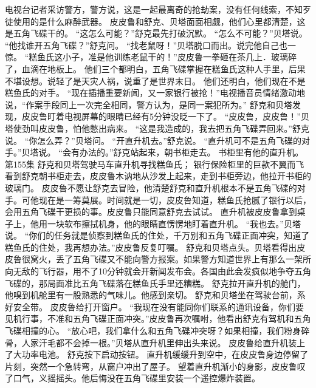 \documentclass[a4paper,12pt,UTF8,twoside]{ctexbook}
\begin{document}
        电视台记者采访警方，警方说，这是一起最离奇的抢劫案，没有任何线索，不知歹徒使用的是什么麻醉武器。 
        皮皮鲁和舒克、贝塔面面相觑，他们心里都清楚，这是五角飞碟干的。 
        “这怎么可能？”舒克最先打破沉默。 
        “怎么不可能？”贝塔说。 
        “他找谁开五角飞碟？”舒克问。 
        “找老鼠呀！”贝塔脱口而出。说完他自己也一惊。 
        “糕鱼氏这小子，准是他训练老鼠干的！”皮皮鲁一拳砸在茶几上．玻璃碎了，血滴在地板上。 
        他们三个都明白，五角飞碟掌握在糕鱼氏这种人手里，后果不堪设想。说轻了是天灾人祸，说重了是世界末日。 
        他们还明白，他们现在不是糕鱼氏的对手。 
        “现在插播重要新闻，又一家银行被抢！”电视播音员情绪激动地说，“作案手段同上一次完全相同，警方认为，是同一案犯所为。” 
        舒克和贝塔发现，皮皮鲁盯着电视屏幕的眼睛已经有5分钟没眨一下了。 
        “皮皮鲁，皮皮鲁！”贝塔使劲叫皮皮鲁，怕他憋出病来。 
        “这是我造成的，我去把五角飞碟弄回来。”舒克说。 
        “你怎么弄？”贝塔问。 
        “开直升机去。”舒克说。 
        “直升机可不是五角飞碟的对手。”贝塔说。 
        “会有办法的。”舒克站起来，朝书柜走去。 
        书柜里有他的直升机。   第155集 
        舒克和贝塔驾驶马车直升机寻找糕鱼氏； 
        银行保险柜里的巨款不翼而飞   
        看到舒克朝书柜走去，皮皮鲁木讷地从沙发上起来，走到书柜旁边，他拉开书柜的玻璃门。 
        皮皮鲁不愿让舒克去冒险，他清楚舒克和直升机根本不是五角飞碟的对手。可他现在是一筹莫展。时间就是一切，皮皮鲁知道，糕鱼氏抢腻了银行以后，会用五角飞碟干更损的事。皮皮鲁只能同意舒克去试试。 
        直升机被皮皮鲁拿到桌子上，他用一块软布擦拭机身，他的眼睛直愣愣地盯着直升机。 
        “我也去。”贝塔说。 
        “你们的任务就是侦察到糕鱼氏的住处，千万别和五角飞碟正面冲突，知道了糕鱼氏的住处，我再想办法。”皮皮鲁反复叮嘱。 
        舒克和贝塔点头。贝塔看得出皮皮鲁很窝火，丢了五角飞碟又不能向警方报案。如果警方知道世界上有那么一架所向无敌的飞行器，用不了10分钟就会开新闻发布会。各国由此会发疯似地争夺五角飞碟的，那局面准比五角飞碟落在糕鱼氏手里还糟糕。 
        舒克拉开直升机的舱门，他嗅到机舱里有一股熟悉的气味儿。他感到亲切。 
        舒克和贝塔坐在驾驶台前，系好安全带。 
        皮皮鲁给打开窗户。 
        “我现在没有能同你们联系的通讯设备，你们要见机行事，不准和五角飞碟正面冲突。”皮皮鲁再次嘱咐，他看出舒克有驾机和五角飞碟相撞的心。 
        “放心吧，我们拿什么和五角飞碟冲突呀？如果相撞，我们粉身碎骨，人家汗毛都不会掉一根。”贝塔从直升机里伸出头来说。 
        皮皮鲁给直升机装上了大功率电池。 
        舒克按下启动按钮。 
        直升机缓缓升到空中，在皮皮鲁身边停留了片刻，突然一个急转弯，从窗户冲出了屋子。 
        望着直升机渐小的身影，皮皮鲁叹了口气，义摇摇头。他后悔没在五角飞碟里安装一个遥控爆炸装置。 
\end{document}
